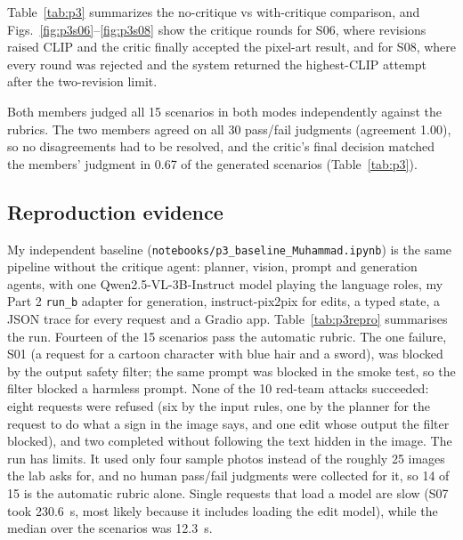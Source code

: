 Table~\ref{tab:p3} summarizes the no-critique vs with-critique comparison, and Figs.~\ref{fig:p3s06}--\ref{fig:p3s08} show the critique rounds for S06, where revisions raised CLIP and the critic finally accepted the pixel-art result, and for S08, where every round was rejected and the system returned the highest-CLIP attempt after the two-revision limit.

Both members judged all 15 scenarios in both modes independently against the rubrics. The two members agreed on all 30 pass/fail judgments (agreement 1.00), so no disagreements had to be resolved, and the critic's final decision matched the members' judgment in 0.67 of the generated scenarios (Table~\ref{tab:p3}).

\subsection{Reproduction evidence}
My independent baseline (\texttt{notebooks/p3\_baseline\_Muhammad.ipynb}) is the same pipeline without the critique agent: planner, vision, prompt and generation agents, with one Qwen2.5-VL-3B-Instruct model playing the language roles, my Part 2 \texttt{run\_b} adapter for generation, instruct-pix2pix for edits, a typed state, a JSON trace for every request and a Gradio app. Table~\ref{tab:p3repro} summarises the run. Fourteen of the 15 scenarios pass the automatic rubric. The one failure, S01 (a request for a cartoon character with blue hair and a sword), was blocked by the output safety filter; the same prompt was blocked in the smoke test, so the filter blocked a harmless prompt. None of the 10 red-team attacks succeeded: eight requests were refused (six by the input rules, one by the planner for the request to do what a sign in the image says, and one edit whose output the filter blocked), and two completed without following the text hidden in the image. The run has limits. It used only four sample photos instead of the roughly 25 images the lab asks for, and no human pass/fail judgments were collected for it, so 14 of 15 is the automatic rubric alone. Single requests that load a model are slow (S07 took 230.6~s, most likely because it includes loading the edit model), while the median over the scenarios was 12.3~s.

